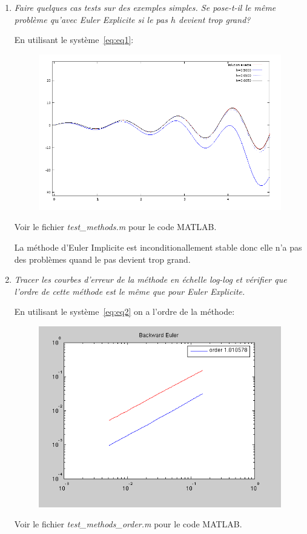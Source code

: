 \documentclass[a4paper,10pt]{article}
\begin{document}
\begin{enumerate}
    \item \emph{Faire quelques cas tests sur des exemples simples. Se pose-t-il le
    même problème qu'avec Euler Explicite si le pas $h$ devient trop grand?}

     En utilisant le système~\eqref{eq:eq1}:
\begin{figure}[h!]
    \centering
    \includegraphics[scale=0.6]{./img/step-backward-euler.png}
\end{figure}

    Voir le fichier \emph{test\_methods.m} pour le code MATLAB.

    La méthode d'Euler Implicite est inconditionallement stable donc elle n'a pas
    des problèmes quand le pas devient trop grand.

    \item \emph{Tracer les courbes d'erreur de la méthode en échelle log-log et
    vérifier que l'ordre de cette méthode est le même que pour Euler Explicite.}

    En utilisant le système~\eqref{eq:eq2} on a l'ordre de la méthode:
\begin{figure}[h!]
    \centering
    \includegraphics[scale=0.5]{./img/order-backward-euler.png}
\end{figure}

    Voir le fichier \emph{test\_methods\_order.m} pour le code MATLAB.
\end{enumerate}
\end{document}
